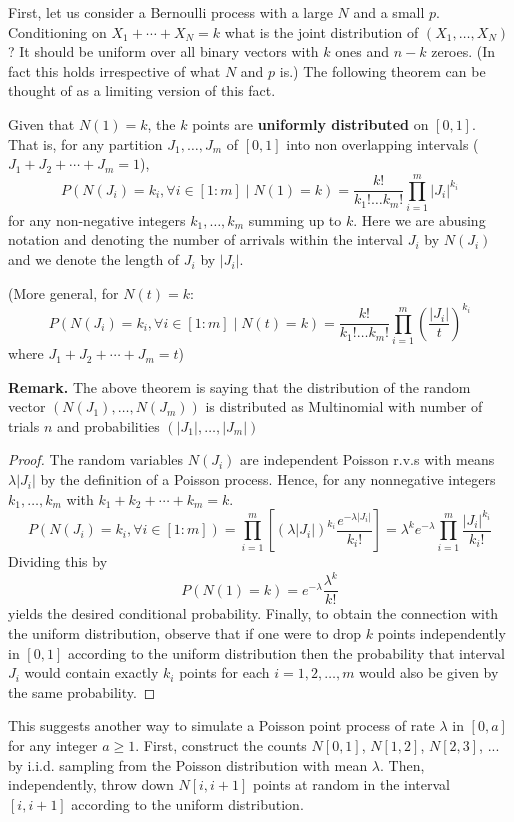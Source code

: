 \documentclass[11pt]{elegantbook}
\begin{document}
First, let us consider a Bernoulli process with a large $N$ and a small $p$. Conditioning on $X_1+\cdots+X_N=k$ what is the joint distribution of $\left(X_1, \ldots, X_N\right)$? It should be uniform over all binary vectors with $k$ ones and $n-k$ zeroes. (In fact this holds irrespective of what $N$ and $p$ is.) The following theorem can be thought of as a limiting version of this fact.
\begin{theorem}
        Given that $N(1)=k$, the $k$ points are \textbf{uniformly distributed} on $[0,1]$.\\
        That is, for any partition $J_1, \ldots, J_m$ of $[0,1]$ into non overlapping intervals ($J_1+J_2+\cdots+J_m=1$),
        $$
        P\left(N\left(J_i\right)=k_i, \forall i \in[1: m] \mid N(1)=k\right)=\frac{k !}{k_{1} ! \ldots k_{m} !} \prod_{i=1}^m\left|J_i\right|^{k_i}
        $$
        for any non-negative integers $k_1, \ldots, k_m$ summing up to $k$. Here we are abusing notation and denoting the number of arrivals within the interval $J_i$ by $N\left(J_i\right)$ and we denote the length of $J_i$ by $\left|J_i\right|$.
\end{theorem}
(More general, for $N(t)=k$: $$
P\left(N\left(J_i\right)=k_i, \forall i \in[1: m] \mid N(t)=k\right)=\frac{k !}{k_{1} ! \ldots k_{m} !} \prod_{i=1}^m\left(\frac{\left|J_i\right|}{t}\right)^{k_i}
$$ where $J_1+J_2+\cdots+J_m=t$)

\textbf{Remark.} The above theorem is saying that the distribution of the random vector $\left(N\left(J_1\right), \ldots, N\left(J_m\right)\right)$ is distributed as Multinomial with number of trials $n$ and probabilities $\left(\left|J_1\right|, \ldots,\left|J_m\right|\right)$
\begin{proof}
    The random variables $N\left(J_i\right)$ are independent Poisson r.v.s with means $\lambda\left|J_i\right|$ by the definition of a Poisson process. Hence, for any nonnegative integers $k_1, \ldots, k_m$ with $k_1+k_2+\cdots+k_m=k$.
    $$
    P\left(N\left(J_i\right)=k_i, \forall i \in[1: m]\right)=\prod_{i=1}^m\left[\left(\lambda\left|J_i\right|\right)^{k_i} \frac{e^{-\lambda\left|J_i\right|}}{k_{i} !}\right]=\lambda^k e^{-\lambda} \prod_{i=1}^m \frac{\left|J_i\right|^{k_i}}{k_{i} !}
    $$
    Dividing this by
    $$
    P(N(1)=k)=e^{-\lambda} \frac{\lambda^k}{k !}
    $$
    yields the desired conditional probability. Finally, to obtain the connection with the uniform distribution, observe that if one were to drop $k$ points independently in $[0,1]$ according to the uniform distribution then the probability that interval $J_i$ would contain exactly $k_i$ points for each $i=1,2, \ldots, m$ would also be given by the same probability.
\end{proof}
\begin{claim}[ Simulation 2.]
    This suggests another way to simulate a Poisson point process of rate $\lambda$ in $[0, a]$ for any integer $a \geq 1$. First, construct the counts $N[0, 1]$, $N[1, 2]$, $N[2, 3]$, ... by i.i.d. sampling from the Poisson distribution with mean $\lambda$. Then, independently, throw down $N [i, i + 1]$ points at random in the interval $[i, i + 1]$ according to the uniform distribution.
\end{claim}
\end{document}

